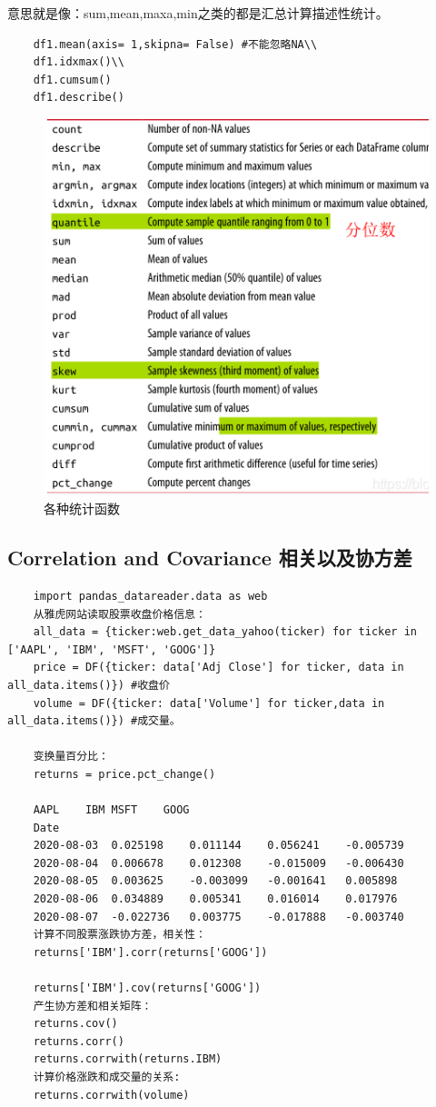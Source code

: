 \documentclass{article}
\begin{document}
意思就是像：sum,mean,maxa,min之类的都是汇总计算描述性统计。\\

\begin{lstlisting}
	df1.mean(axis= 1,skipna= False) #不能忽略NA\\
	df1.idxmax()\\
	df1.cumsum() 
	df1.describe()
\end{lstlisting}

\begin{figure}[hbtp]
	\centering
	\includegraphics[width=\linewidth]{fig/df6}
	\caption{各种统计函数}
	\label{fig-tongjihanshu}
\end{figure}

\subsection{Correlation and Covariance 相关以及协方差}
\begin{lstlisting}
	import pandas_datareader.data as web
	从雅虎网站读取股票收盘价格信息：
	all_data = {ticker:web.get_data_yahoo(ticker) for ticker in ['AAPL', 'IBM', 'MSFT', 'GOOG']}
	price = DF({ticker: data['Adj Close'] for ticker, data in all_data.items()}) #收盘价
	volume = DF({ticker: data['Volume'] for ticker,data in all_data.items()}) #成交量。
	
	变换量百分比：
	returns = price.pct_change()
	
	AAPL	IBM	MSFT	GOOG
	Date				
	2020-08-03	0.025198	0.011144	0.056241	-0.005739
	2020-08-04	0.006678	0.012308	-0.015009	-0.006430
	2020-08-05	0.003625	-0.003099	-0.001641	0.005898
	2020-08-06	0.034889	0.005341	0.016014	0.017976
	2020-08-07	-0.022736	0.003775	-0.017888	-0.003740
	计算不同股票涨跌协方差，相关性：
	returns['IBM'].corr(returns['GOOG'])
	
	returns['IBM'].cov(returns['GOOG'])
	产生协方差和相关矩阵：
	returns.cov()
	returns.corr() 
	returns.corrwith(returns.IBM)
	计算价格涨跌和成交量的关系:
	returns.corrwith(volume)
\end{lstlisting}
\end{document}
